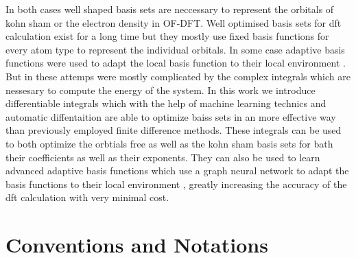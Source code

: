 In both cases well shaped basis sets are neccessary to represent the orbitals of kohn sham or the electron density in OF-DFT. Well optimised basis sets for dft calculation exist for a long time \cite{something} but they mostly use fixed basis functions for every atom type to represent the individual orbitals. In some case adaptive basis functions were used to adapt the local basis function to their local environment \cite{something}. But in these  attemps were mostly complicated by the complex integrals which are nessesary to compute the energy of the system. In this work we introduce differentiable integrals which with the help of machine learning technics and automatic diffentaition are  able to optimize baiss sets in an more effective way than previously employed finite difference methods. These integrals can be used to both optimize the orbtials free as well as the kohn sham basis sets for bath their coefficients as well as their exponents. They can also be used to learn advanced adaptive basis functions which use a graph neural network to adapt the basis functions to their local environment , greatly increasing the accuracy of the dft calculation with very minimal cost.
\newpage
\section{Conventions and Notations}
